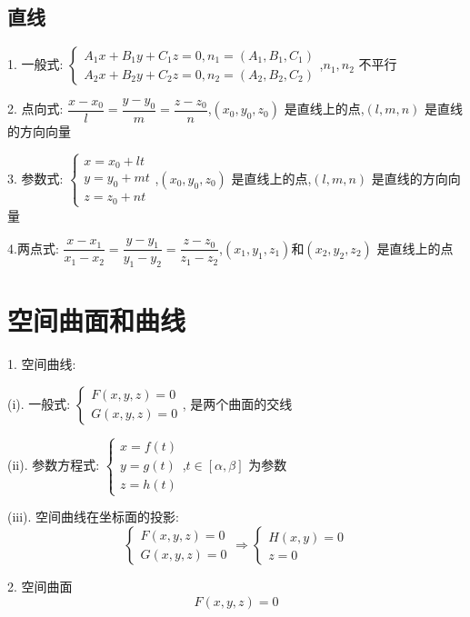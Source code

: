 \subsection{直线}
\begin{definition}[直线方程]
	
	1. 一般式:  $\left\lbrace \begin{array}{c}
		A_{1}x+B_{1}y+C_{1}z=0,n_{1}=(A_{1},B_{1},C_{1})\\A_{2}x+B_{2}y+C_{2}z=0,n_{2}=(A_{2},B_{2},C_{2})
	\end{array}\right. $,$n_{1},n_{2}$ 不平行
	
	2. 点向式:  $\dfrac{x-x_{0}}{l}=\dfrac{y-y_{0}}{m}=\dfrac{z-z_{0}}{n}$,$(x_{0},y_{0},z_{0})$ 是直线上的点,$(l,m,n)$ 是直线的方向向量
	
	3. 参数式:  $\left\lbrace\begin{array}{l}
		x=x_{0}+lt\\
		y=y_{0}+mt\\
		z=z_{0}+nt
	\end{array} \right. $,$(x_{0},y_{0},z_{0})$ 是直线上的点,$(l,m,n)$ 是直线的方向向量
	
	4.两点式: $\dfrac{x-x_{1}}{x_{1}-x_{2}}=\dfrac{y-y_{1}}{y_{1}-y_{2}}=\dfrac{z-z_{0}}{z_{1}-z_{2}}$,$(x_{1},y_{1},z_{1})$和$(x_{2},y_{2},z_{2})$ 是直线上的点
\end{definition}
\section{空间曲面和曲线}
\begin{definition}[空间曲面和曲线]
	1. 空间曲线: 
	
	(i). 一般式: $\left\lbrace\begin{array}{l}
		F(x,y,z)=0\\G(x,y,z)=0
	\end{array} \right. $, 是两个曲面的交线
	
	(ii). 参数方程式: $\left\lbrace\begin{array}{l}
		x=f(t)\\y=g(t)\\z=h(t)
	\end{array} \right. $,$t\in[\alpha,\beta]$ 为参数
	
	(iii). 空间曲线在坐标面的投影: 
	$$\left\lbrace\begin{array}{l}
		F(x,y,z)=0\\G(x,y,z)=0
	\end{array} \right. \Rightarrow \left\lbrace\begin{array}{l}
		H(x,y)=0\\z=0
	\end{array} \right.$$
	
	2. 空间曲面
	$$F(x,y,z)=0$$
\end{definition}
